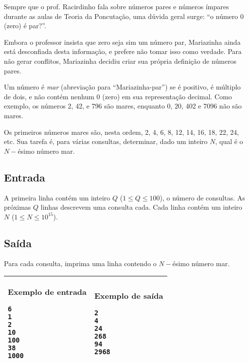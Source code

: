 \vspace{-0.5cm}
Sempre que o prof. Racirdinho fala sobre números pares e números ímpares durante
as aulas de Teoria da Poncutação, uma dúvida geral surge: ``o número 0 (zero) é
par?''.

Embora o professor insista que zero seja sim um número par, Mariazinha ainda está
desconfiada desta informação, e prefere não tomar isso como verdade. Para não
gerar conflitos, Mariazinha decidiu criar sua própria definição de números pares.

Um número é \textit{mar} (abreviação para ``Mariazinha-par'') se é positivo, é
múltiplo de dois, e não contém nenhum 0 (zero) em sua representação decimal.
Como exemplo, os números 2, 42, e 796 são mares, enquanto 0, 20, 402 e 7096 não são
mares.

Os primeiros números mares são, nesta ordem, 2, 4, 6, 8, 12, 14, 16, 18, 22, 24, etc.
Sua tarefa é, para várias consultas, determinar, dado um inteiro $N$, qual é o $N-$ésimo número mar.

\subsection*{Entrada}

A primeira linha contém um inteiro $Q$ ($1 \leq Q \leq 100$), o número de
consultas. As próximas $Q$ linhas descrevem uma consulta cada.
Cada linha contém um inteiro $N$ ($1 \leq N \leq 10^{15}$).

\subsection*{Saída}

Para cada consulta, imprima uma linha contendo o $N-$ésimo número mar.

\begin{table}[!h]
\centering
\begin{tabular}{|l|l|}
\hline
\begin{minipage}[t]{3in}
\textbf{Exemplo de entrada}
\begin{verbatim}
6
1
2
10
100
38
1000
\end{verbatim}
\vspace{1mm}
\end{minipage}
&
\begin{minipage}[t]{3in}
\textbf{Exemplo de saída}
\begin{verbatim}
2
4
24
268
94
2968
\end{verbatim}
\vspace{1mm}
\end{minipage} \\
\hline
\end{tabular}
\end{table}
